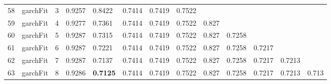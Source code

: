 \documentclass[10pt,a4paper]{article}
\begin{document}
\begin{table}[ht]
\begin{tabular}{rlrllllllllll}
  58 & garchFit &     3 & 0.9257 & 0.8422 & 0.7414 & 0.7419 & 0.7522 &  &  &  &  &  \\ 
  59 & garchFit &     4 & 0.9277 & 0.7361 & 0.7414 & 0.7419 & 0.7522 & 0.827 &  &  &  &  \\ 
  60 & garchFit &     5 & 0.9287 & 0.7315 & 0.7414 & 0.7419 & 0.7522 & 0.827 & 0.7258 &  &  &  \\ 
  61 & garchFit &     6 & 0.9287 & 0.7221 & 0.7414 & 0.7419 & 0.7522 & 0.827 & 0.7258 & 0.7217 &  &  \\ 
  62 & garchFit &     7 & 0.9287 & 0.7137 & 0.7414 & 0.7419 & 0.7522 & 0.827 & 0.7258 & 0.7217 & 0.7213 &  \\ 
  63 & garchFit &     8 & 0.9286 & \textbf{0.7125} & 0.7414 & 0.7419 & 0.7522 & 0.827 & 0.7258 & 0.7217 & 0.7213 & 0.713 \\ 
   \hline
\end{tabular}
\end{table}
\end{document}

